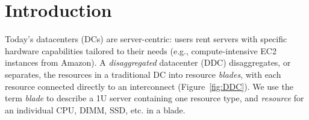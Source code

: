 
\section{Introduction} 
\label{sec:intro}
Today's datacenters (DCs) are server-centric: users rent servers with
specific hardware capabilities tailored to their needs (e.g.,
compute-intensive EC2 instances from Amazon). 
A \emph{disaggregated} datacenter (DDC) disaggregates, or separates,
the resources in a traditional DC into resource \emph{blades},
with each resource connected directly to an interconnect (Figure~\ref{fig:DDC}). 
We use the term \emph{blade} to describe a 1U server containing one resource
type, and \emph{resource} for an individual CPU, DIMM, SSD, etc. in a blade. 






